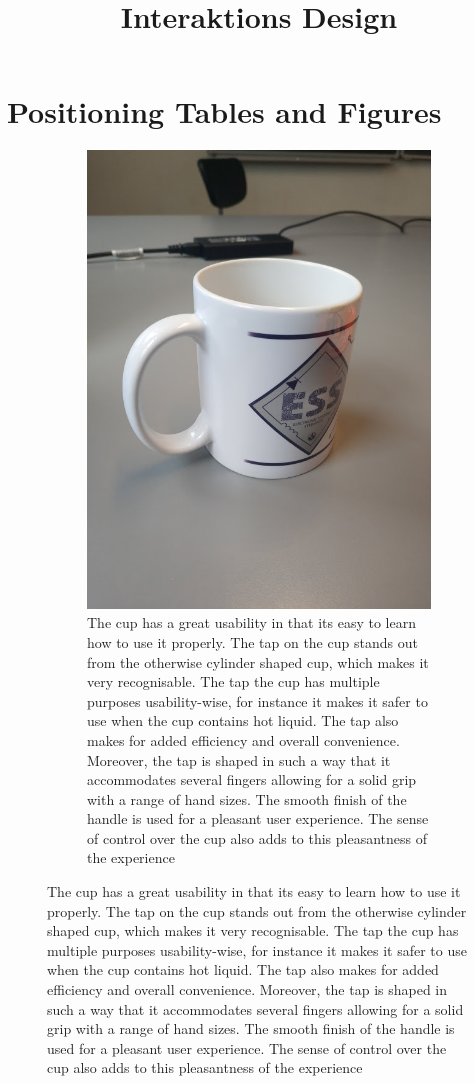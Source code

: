 \documentclass[11pt]{article}
\title{Interaktions Design}
\author{ }
\date{ }
\begin{document}
\section{Positioning Tables and Figures}

\begin{figure}[!h]
    \begin{subfigure}[t]{0.5\textwidth}
        \includegraphics[scale=0.4]{InteraktionsDesign/Assets/kop.jpg}
        \caption{The cup has a great usability in that its easy to learn how to use it properly. The tap on the cup stands out from the otherwise cylinder shaped cup, which makes it very recognisable. The tap the cup has multiple purposes usability-wise, for instance it makes it safer to use when the cup contains hot liquid. The tap also makes for added efficiency and overall convenience.
        Moreover, the tap is shaped in such a way that it accommodates several fingers allowing for a solid grip with a range of hand sizes. The smooth finish of the handle is used for a pleasant user experience. The sense of control over the cup also adds to this pleasantness of the experience}

\end{subfigure}
\end{figure}
\end{document}
